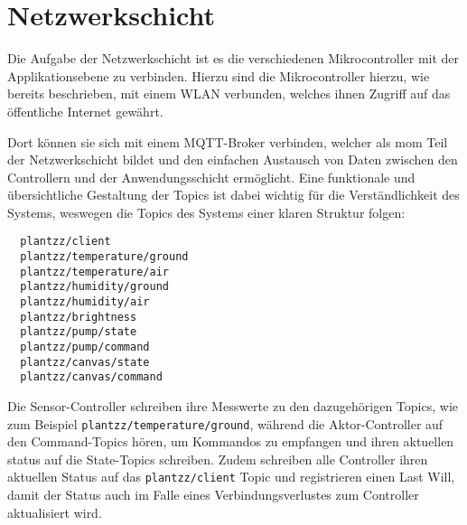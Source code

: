 
\section{Netzwerkschicht}

Die Aufgabe der Netzwerkschicht ist es die verschiedenen Mikrocontroller mit der Applikationsebene zu verbinden.
Hierzu sind die Mikrocontroller hierzu, wie bereits beschrieben, mit einem WLAN verbunden, welches ihnen Zugriff auf das öffentliche Internet gewährt.

Dort können sie sich mit einem MQTT-Broker verbinden, welcher als \gls{mom} Teil der Netzwerkschicht bildet und den einfachen Austausch von Daten zwischen den Controllern und der Anwendungsschicht ermöglicht.
Eine funktionale und übersichtliche Gestaltung der Topics ist dabei wichtig für die Verständlichkeit des Systems, weswegen die Topics des Systems einer klaren Struktur folgen:

\begin{verbatim}
  plantzz/client
  plantzz/temperature/ground
  plantzz/temperature/air
  plantzz/humidity/ground
  plantzz/humidity/air
  plantzz/brightness
  plantzz/pump/state
  plantzz/pump/command
  plantzz/canvas/state
  plantzz/canvas/command
\end{verbatim}

Die Sensor-Controller schreiben ihre Messwerte zu den dazugehörigen Topics, wie zum Beispiel \texttt{plantzz/temperature/ground}, während die Aktor-Controller auf den Command-Topics hören, um Kommandos zu empfangen und ihren aktuellen status auf die State-Topics schreiben.
Zudem schreiben alle Controller ihren aktuellen Status auf das \texttt{plantzz/client} Topic und registrieren einen Last Will, damit der Status auch im Falle eines Verbindungsverlustes zum Controller aktualisiert wird.
